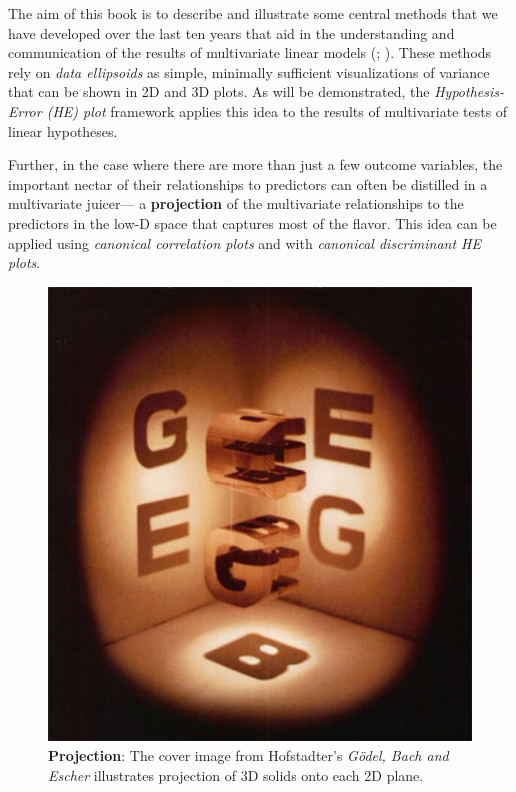 \documentclass[
  letterpaper,
  10pt,
  krantz2]{krantz}
\begin{document}
The aim of this book is to describe and illustrate some central methods
that we have developed over the last ten years that aid in the
understanding and communication of the results of multivariate linear
models (;
). These
methods rely on \emph{data ellipsoids} as simple, minimally sufficient
visualizations of variance that can be shown in 2D and 3D plots. As will
be demonstrated, the \emph{Hypothesis-Error (HE) plot} framework applies
this idea to the results of multivariate tests of linear hypotheses.

Further, in the case where there are more than just a few outcome
variables, the important nectar of their relationships to predictors can
often be distilled in a multivariate juicer--- a \textbf{projection} of
the multivariate relationships to the predictors in the low-D space that
captures most of the flavor. This idea can be applied using
\emph{canonical correlation plots} and with \emph{canonical discriminant
HE plots}.

\begin{figure}[H]

{\centering \includegraphics{images/Cover-GBE.png}

}

\caption{\textbf{Projection}: The cover image from Hofstadter's
\emph{Gödel, Bach and Escher} illustrates projection of 3D solids onto
each 2D plane.}

\end{figure}%
\end{document}
